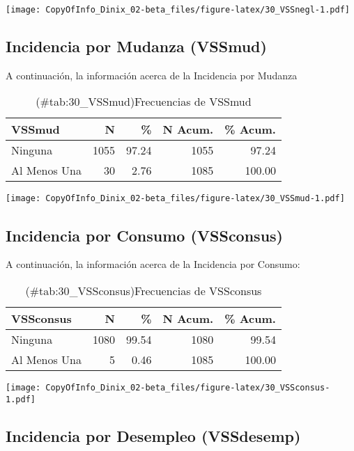 \documentclass[
]{article}
\begin{document}
\texttt{[image: CopyOfInfo\_Dinix\_02-beta\_files/figure-latex/30\_VSSnegl-1.pdf]}

\subsection{Incidencia por Mudanza (VSSmud)}\label{incidencia-por-mudanza-vssmud}

A continuación, la información acerca de la Incidencia por Mudanza

\begin{table}

\caption{(\#tab:30_VSSmud)Frecuencias de VSSmud}
\centering
\begin{tabular}[t]{lrrrr}
\toprule
VSSmud & N & \% & N Acum. & \% Acum.\\
\midrule
Ninguna & 1055 & 97.24 & 1055 & 97.24\\
Al Menos Una & 30 & 2.76 & 1085 & 100.00\\
\bottomrule
\end{tabular}
\end{table}

\texttt{[image: CopyOfInfo\_Dinix\_02-beta\_files/figure-latex/30\_VSSmud-1.pdf]}

\subsection{Incidencia por Consumo (VSSconsus)}\label{incidencia-por-consumo-vssconsus}

A continuación, la información acerca de la Incidencia por Consumo:

\begin{table}

\caption{(\#tab:30_VSSconsus)Frecuencias de VSSconsus}
\centering
\begin{tabular}[t]{lrrrr}
\toprule
VSSconsus & N & \% & N Acum. & \% Acum.\\
\midrule
Ninguna & 1080 & 99.54 & 1080 & 99.54\\
Al Menos Una & 5 & 0.46 & 1085 & 100.00\\
\bottomrule
\end{tabular}
\end{table}

\texttt{[image: CopyOfInfo\_Dinix\_02-beta\_files/figure-latex/30\_VSSconsus-1.pdf]}

\subsection{Incidencia por Desempleo (VSSdesemp)}\label{incidencia-por-desempleo-vssdesemp}
\end{document}
